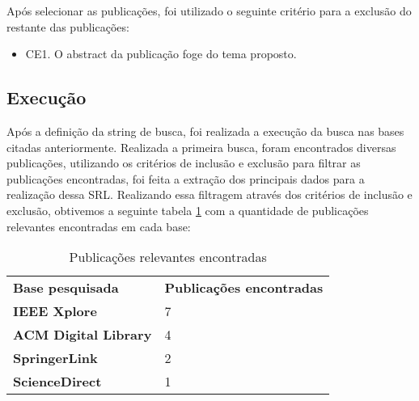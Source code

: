 \documentclass[12pt]{article}
\begin{document}
Após selecionar as publicações, foi utilizado o seguinte critério para a exclusão do restante das publicações:

\begin{itemize}
  \item CE1. O abstract da publicação foge do tema proposto.
\end{itemize}

\subsection{Execução}

Após a definição da string de busca, foi realizada a execução da busca nas bases citadas anteriormente. Realizada a primeira
busca, foram encontrados diversas publicações, utilizando os critérios de inclusão e exclusão para filtrar as publicações
encontradas, foi feita a extração dos principais dados para a realização dessa SRL. Realizando essa filtragem através dos
critérios de inclusão e exclusão, obtivemos a seguinte tabela \ref{publicações} com a quantidade de publicações relevantes
encontradas em cada base:


\begin{table}[h]
 \centering
 {\renewcommand\arraystretch{1.25}
 \begin{tabular}{ l l }
  \cline{1-1}\cline{2-2}  
    \multicolumn{1}{|p{4.500cm}|}{\textbf{Base pesquisada}} &
    \multicolumn{1}{p{4.500cm}|}{\textbf{Publicações encontradas}}
  \\  
  \cline{1-1}\cline{2-2}  
    \multicolumn{1}{|p{4.500cm}|}{\textbf{IEEE Xplore} \centering } &
    \multicolumn{1}{p{4.500cm}|}{7 \centering }
  \\  
  \cline{1-1}\cline{2-2}  
    \multicolumn{1}{|p{4.500cm}|}{\textbf{ACM Digital Library} \centering } &
    \multicolumn{1}{p{4.500cm}|}{4 \centering }
  \\  
  \cline{1-1}\cline{2-2}  
    \multicolumn{1}{|p{4.500cm}|}{\textbf{SpringerLink} \centering } &
    \multicolumn{1}{p{4.500cm}|}{2 \centering }
  \\  
  \cline{1-1}\cline{2-2}  
    \multicolumn{1}{|p{4.500cm}|}{\textbf{ScienceDirect} \centering } &
    \multicolumn{1}{p{4.500cm}|}{1 \centering }
  \\  
  \hline

 \end{tabular} }
 \caption{Publicações relevantes encontradas} 
 \label{publicações} 
\end{table}
\end{document}
